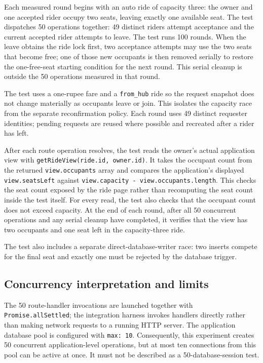 \documentclass[11pt,a4paper]{article}
\begin{document}
Each measured round begins with an auto ride of capacity three: the owner and one accepted rider
occupy two seats, leaving exactly one available seat. The test dispatches 50 operations together:
49 distinct riders attempt acceptance and the current accepted rider attempts to leave. The test
runs 100 rounds. When the leave obtains the ride lock first, two acceptance attempts may use the
two seats that become free; one of those new occupants is then removed serially to restore the
one-free-seat starting condition for the next round. This serial cleanup is outside the 50
operations measured in that round.

The test uses a one-rupee fare and a \texttt{from\_hub} ride so the request snapshot does not change
materially as occupants leave or join. This isolates the capacity race from the separate
reconfirmation policy. Each round uses 49 distinct requester identities; pending requests are
reused where possible and recreated after a rider has left.

After each route operation resolves, the test reads the owner's actual application view with
\texttt{getRideView(ride.id, owner.id)}. It takes the occupant count from the returned
\texttt{view.occupants} array and compares the application's displayed \texttt{view.seatsLeft}
against \texttt{view.capacity - view.occupants.length}. This checks the seat count exposed by the
ride page rather than recomputing the seat count inside the test itself. For every read, the test
also checks that the occupant count does not exceed capacity. At the end of each round, after all
50 concurrent operations and any serial cleanup have completed, it verifies that the view has
two occupants and one seat left in the capacity-three ride.

The test also includes a separate direct-database-writer race: two inserts compete for the final
seat and exactly one must be rejected by the database trigger.

\subsection{Concurrency interpretation and limits}

The 50 route-handler invocations are launched together with \texttt{Promise.allSettled}; the
integration harness invokes handlers directly rather than making network requests to a running
HTTP server. The application database pool is configured with \texttt{max: 10}. Consequently,
this experiment creates 50 concurrent application-level operations, but at most ten connections
from this pool can be active at once. It must not be described as a 50-database-session test.
\end{document}
